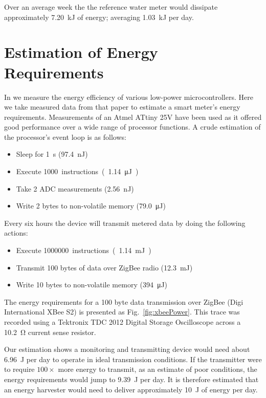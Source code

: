 \documentclass[10pt,final,journal]{IEEEtran}
\begin{document}
    Over an average week the the reference water meter would dissipate approximately \SI{7.20}{\kilo\joule} of energy; averaging \SI{1.03}{\kilo\joule} per day.

    \section{Estimation of Energy Requirements}
    \label{sect:powerRequirements}
    In \cite{Jones2011} we measure the energy efficiency of various low-power microcontrollers.
    Here we take measured data from that paper to estimate a smart meter's energy requirements.
    Measurements of an Atmel ATtiny 25V have been used as it offered good performance over a wide range of processor functions.
    A crude estimation of the processor's event loop is as follows:
    \begin{itemize}
    \item Sleep for \SI{1}{\second} (\SI{97.4}{\nano\joule})
    \item Execute \SI{1000} instructions (\SI{1.14}{\micro\joule})
    \item Take 2 ADC measurements (\SI{2.56}{\nano\joule})
    \item Write 2 bytes to non-volatile memory (\SI{79.0}{\micro\joule})
    \end{itemize}
    Every six hours the device will transmit metered data by doing the following actions:
    \begin{itemize}
    \item Execute \SI{1000000} instructions (\SI{1.14}{\milli\joule})
    \item Transmit 100 bytes of data over ZigBee radio (\SI{12.3}{\milli\joule})
    \item Write 10 bytes to non-volatile memory (\SI{394}{\micro\joule})
    \end{itemize}

    The energy requirements for a 100 byte data transmission over ZigBee (Digi International XBee S2) is presented as Fig.~\ref{fig:xbeePower}.
    This trace was recorded using a Tektronix TDC 2012 Digital Storage Oscilloscope across a \SI{10.2}{\ohm} current sense resistor.

    Our estimation shows a monitoring and transmitting device would need about \SI{6.96}{\joule} per day to operate in ideal transmission conditions.
    If the transmitter were to require $100\times$ more energy to transmit, as an estimate of poor conditions, the energy requirements would jump to \SI{9.39}{\joule} per day.
    It is therefore estimated that an energy harvester would need to deliver approximately \SI{10}{\joule} of energy per day.
\end{document}
